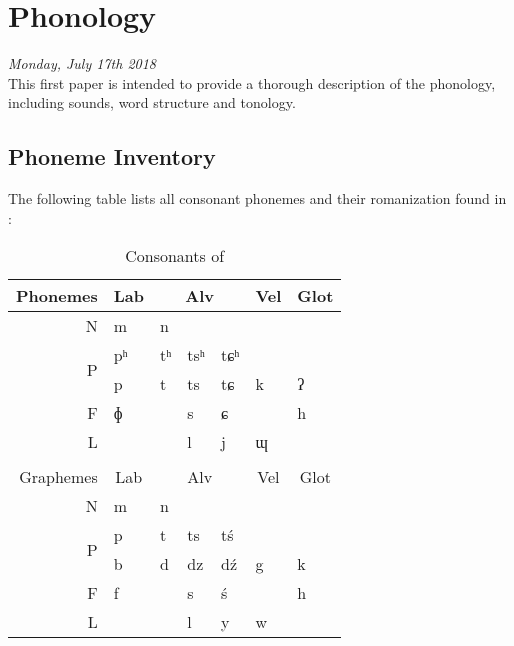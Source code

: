 \section{Phonology}
\emph{Monday, July 17th 2018}\\

\noindent This first paper is intended to provide a thorough description of the \lang{} phonology, including sounds, word structure and tonology.

\subsection{Phoneme Inventory}
The following table lists all consonant phonemes and their romanization found in \lang{}:
\begin{table}[H]
\centering
\begin{tabular}{r|l|lll|l|l}
Phonemes           & \multicolumn{1}{c|}{Lab} & \multicolumn{3}{c|}{Alv} & \multicolumn{1}{c|}{Vel} & \multicolumn{1}{c}{Glot} \\ \hline
N                  & m                        & n      &        &        &                          &                          \\
\multirow{2}{*}{P} & pʰ                       & tʰ     & tsʰ    & tɕʰ    &                          &                          \\
                   & p                        & t      & ts     & tɕ     & k                        & ʔ                        \\
F                  & ɸ                        &        & s      & ɕ      &                          & h                        \\
L                  &                          &        & l      & j      & ɰ                        & \\
\multicolumn{1}{c}{}\\                        
Graphemes          & \multicolumn{1}{c|}{Lab} & \multicolumn{3}{c|}{Alv} & \multicolumn{1}{c|}{Vel} & \multicolumn{1}{c}{Glot} \\ \hline
N                  & m                        & n      &        &        &                          &                          \\
\multirow{2}{*}{P} & p                        & t      & ts     & tś     &                          &                          \\
                   & b                        & d      & dz     & dź     & g & k                        \\
F                  & f                        &        & s      & ś      &                          & h                        \\
L                  &                          &        & l      & y      & w                        &                         
\end{tabular}
\label{consonants}
\caption{Consonants of \lang{}}
\end{table}


